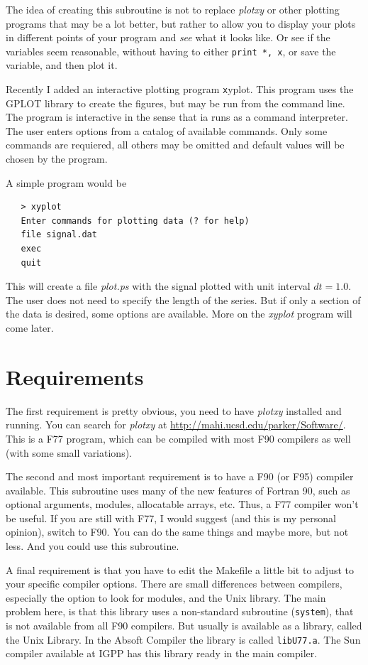 \documentclass{article}
\begin{document}
The idea of creating this subroutine is not to replace {\it plotxy} or other plotting programs that may be a lot better, but rather to allow you to display your plots in different points of your program and {\it see} what it looks like. Or see if the variables seem reasonable, without having to either \texttt{print *, x}, or save the variable, and then plot it.

Recently I added an interactive plotting program {\texttt xyplot}. This program uses the GPLOT library to create the figures, but may be run from the command line. The program is interactive in the sense that ia runs as a command interpreter. The user enters options from a catalog of available commands. Only some commands are requiered, all others may be omitted and default values will be chosen by the program. 

\noindent A simple program would be

\begin{verbatim}
   > xyplot
   Enter commands for plotting data (? for help)
   file signal.dat
   exec
   quit
\end{verbatim}
This will create a file {\it plot.ps} with the signal plotted with unit interval $dt=1.0$. The user does not need to specify the length of the series. But if only a section of the data is desired, some options are available. More on the {\it xyplot} program will come later.

\section{Requirements}
The first requirement is pretty obvious, you need to have {\it plotxy} installed and running. You can search for {\it plotxy} at \underline{http://mahi.ucsd.edu/parker/Software/}. This is a F77 program, which can be compiled with most F90 compilers as well (with some small variations). 

The second and most important requirement is to have a F90 (or F95) compiler available. This subroutine uses many of the new features of Fortran 90, such as optional arguments, modules, allocatable arrays, etc. Thus, a F77 compiler won't be useful. If you are still with F77, I would suggest (and this is my personal opinion), switch to F90. You can do the same things and maybe more, but not less. And you could use this subroutine. 

A final requirement is that you have to edit the Makefile a little bit to adjust to your specific compiler options.  
There are small differences between compilers, especially the option to look for modules, and the Unix library. The main problem here, is that this library uses a non-standard subroutine (\texttt{system}), that is not available from all F90 compilers. But usually is available as a library, called the Unix Library. In the Absoft Compiler the library is called \texttt{libU77.a}. The Sun compiler available at IGPP has this library ready in the main compiler. 
\end{document}
